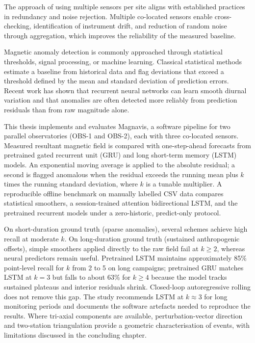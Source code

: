 \documentclass[12pt, a4paper, twoside, openright]{Thesis} %
\newcommand\myemptypage{
    \null
    \thispagestyle{empty}
    \addtocounter{page}{-1}
    \newpage
    }
\begin{document}
{The approach of using multiple sensors per site aligns with established practices in redundancy and noise rejection. Multiple co-located sensors enable cross-checking, identification of instrument drift, and reduction of random noise through aggregation, which improves the reliability of the measured baseline.

Magnetic anomaly detection is commonly approached through statistical thresholds, signal processing, or machine learning. Classical statistical methods estimate a baseline from historical data and flag deviations that exceed a threshold defined by the mean and standard deviation of prediction errors. Recent work has shown that recurrent neural networks can learn smooth diurnal variation and that anomalies are often detected more reliably from prediction residuals than from raw magnitude alone.

This thesis implements and evaluates Magnavis, a software pipeline for two parallel observatories (OBS-1 and OBS-2), each with three co-located sensors. Measured resultant magnetic field is compared with one-step-ahead forecasts from pretrained gated recurrent unit (GRU) and long short-term memory (LSTM) models. An exponential moving average is applied to the absolute residual; a second is flagged anomalous when the residual exceeds the running mean plus $k$ times the running standard deviation, where $k$ is a tunable multiplier. A reproducible offline benchmark on manually labelled CSV data compares statistical smoothers, a session-trained attention bidirectional LSTM, and the pretrained recurrent models under a zero-historic, predict-only protocol.

On short-duration ground truth (sparse anomalies), several schemes achieve high recall at moderate $k$. On long-duration ground truth (sustained anthropogenic offsets), simple smoothers applied directly to the raw field fail at $k \ge 2$, whereas neural predictors remain useful. Pretrained LSTM maintains approximately 85\% point-level recall for $k$ from 2 to 5 on long campaigns; pretrained GRU matches LSTM at $k=3$ but falls to about 63\% for $k \ge 4$ because the model tracks sustained plateaus and interior residuals shrink. Closed-loop autoregressive rolling does not remove this gap. The study recommends LSTM at $k \approx 3$ for long monitoring periods and documents the software artefacts needed to reproduce the results. Where tri-axial components are available, perturbation-vector direction and two-station triangulation provide a geometric characterisation of events, with limitations discussed in the concluding chapter.

}
\newpage
\myemptypage
\end{document}
